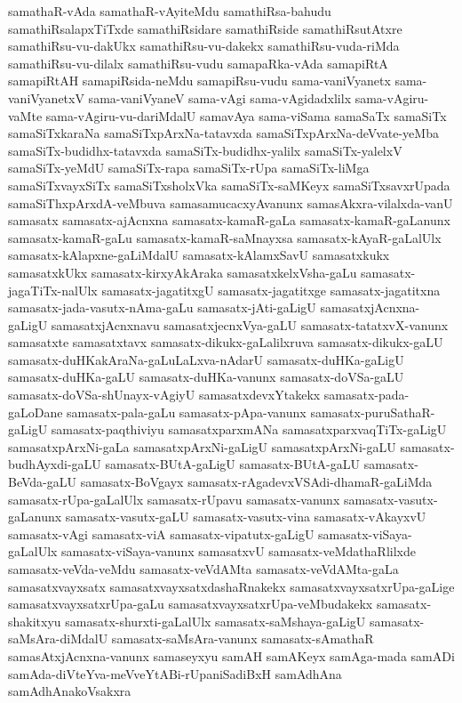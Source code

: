 {samathaR-vAda
samathaR-vAyiteMdu
samathiRsa-bahudu
samathiRsalapxTiTxde
samathiRsidare
samathiRside
samathiRsutAtxre
samathiRsu-vu-dakUkx
samathiRsu-vu-dakekx
samathiRsu-vuda-riMda
samathiRsu-vu-dilalx
samathiRsu-vudu
samapaRka-vAda
samapiRtA
samapiRtAH
samapiRsida-neMdu
samapiRsu-vudu
sama-vaniVyanetx
sama-vaniVyanetxV
sama-vaniVyaneV
sama-vAgi
sama-vAgidadxlilx
sama-vAgiru-vaMte
sama-vAgiru-vu-dariMdalU
samavAya
sama-viSama
samaSaTx
samaSiTx
samaSiTxkaraNa
samaSiTxpArxNa-tatavxda
samaSiTxpArxNa-deVvate-yeMba
samaSiTx-budidhx-tatavxda
samaSiTx-budidhx-yalilx
samaSiTx-yalelxV
samaSiTx-yeMdU
samaSiTx-rapa
samaSiTx-rUpa
samaSiTx-liMga
samaSiTxvayxSiTx
samaSiTxsholxVka
samaSiTx-saMKeyx
samaSiTxsavxrUpada
samaSiThxpArxdA-veMbuva
samasamucacxyAvanunx
samasAkxra-vilalxda-vanU
samasatx
samasatx-ajAcnxna
samasatx-kamaR-gaLa
samasatx-kamaR-gaLanunx
samasatx-kamaR-gaLu
samasatx-kamaR-saMnayxsa
samasatx-kAyaR-gaLalUlx
samasatx-kAlapxne-gaLiMdalU
samasatx-kAlamxSavU
samasatxkukx
samasatxkUkx
samasatx-kirxyAkAraka
samasatxkelxVsha-gaLu
samasatx-jagaTiTx-nalUlx
samasatx-jagatitxgU
samasatx-jagatitxge
samasatx-jagatitxna
samasatx-jada-vasutx-nAma-gaLu
samasatx-jAti-gaLigU
samasatxjAcnxna-gaLigU
samasatxjAcnxnavu
samasatxjecnxVya-gaLU
samasatx-tatatxvX-vanunx
samasatxte
samasatxtavx
samasatx-dikukx-gaLalilxruva
samasatx-dikukx-gaLU
samasatx-duHKakAraNa-gaLuLaLxva-nAdarU
samasatx-duHKa-gaLigU
samasatx-duHKa-gaLU
samasatx-duHKa-vanunx
samasatx-doVSa-gaLU
samasatx-doVSa-shUnayx-vAgiyU
samasatxdevxYtakekx
samasatx-pada-gaLoDane
samasatx-pala-gaLu
samasatx-pApa-vanunx
samasatx-puruSathaR-gaLigU
samasatx-paqthiviyu
samasatxparxmANa
samasatxparxvaqTiTx-gaLigU
samasatxpArxNi-gaLa
samasatxpArxNi-gaLigU
samasatxpArxNi-gaLU
samasatx-budhAyxdi-gaLU
samasatx-BUtA-gaLigU
samasatx-BUtA-gaLU
samasatx-BeVda-gaLU
samasatx-BoVgayx
samasatx-rAgadevxVSAdi-dhamaR-gaLiMda
samasatx-rUpa-gaLalUlx
samasatx-rUpavu
samasatx-vanunx
samasatx-vasutx-gaLanunx
samasatx-vasutx-gaLU
samasatx-vasutx-vina
samasatx-vAkayxvU
samasatx-vAgi
samasatx-viA
samasatx-vipatutx-gaLigU
samasatx-viSaya-gaLalUlx
samasatx-viSaya-vanunx
samasatxvU
samasatx-veMdathaRlilxde
samasatx-veVda-veMdu
samasatx-veVdAMta
samasatx-veVdAMta-gaLa
samasatxvayxsatx
samasatxvayxsatxdashaRnakekx
samasatxvayxsatxrUpa-gaLige
samasatxvayxsatxrUpa-gaLu
samasatxvayxsatxrUpa-veMbudakekx
samasatx-shakitxyu
samasatx-shurxti-gaLalUlx
samasatx-saMshaya-gaLigU
samasatx-saMsAra-diMdalU
samasatx-saMsAra-vanunx
samasatx-sAmathaR
samasAtxjAcnxna-vanunx
samaseyxyu
samAH
samAKeyx
samAga-mada
samADi
samAda-diVteYva-meVveYtABi-rUpaniSadiBxH
samAdhAna
samAdhAnakoVsakxra
}
